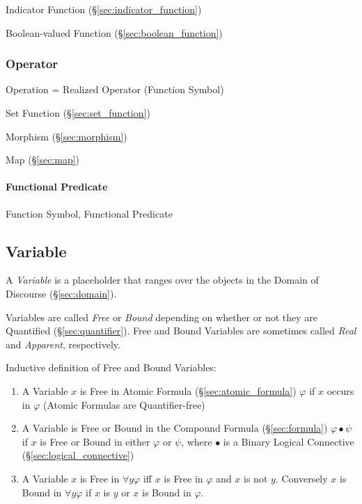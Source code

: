 Indicator Function (\S\ref{sec:indicator_function})

Boolean-valued Function (\S\ref{sec:boolean_function})



\subsubsection{Operator}\label{sec:operator}

Operation = Realized Operator (Function Symbol)

Set Function (\S\ref{sec:set_function})

Morphism (\S\ref{sec:morphism})

Map (\S\ref{sec:map})



\paragraph{Functional Predicate}\label{sec:functional_predicate}\hfill

Function Symbol, Functional Predicate



\subsection{Variable}\label{sec:variable}

A \emph{Variable} is a placeholder that ranges over the objects in the
Domain of Discourse (\S\ref{sec:domain}).

Variables are called \emph{Free} or \emph{Bound} depending on whether
or not they are Quantified (\S\ref{sec:quantifier}). Free and Bound
Variables are sometimes called \emph{Real} and \emph{Apparent},
respectively.

Inductive definition of Free and Bound Variables:
\begin{enumerate}
\item A Variable $x$ is Free in Atomic Formula
  (\S\ref{sec:atomic_formula}) $\varphi$ if $x$ occurs in $\varphi$
  (Atomic Formulas are Quantifier-free)
\item A Variable is Free or Bound in the Compound Formula
  (\S\ref{sec:formula}) $\varphi \bullet \psi$ if $x$ is Free or Bound
  in either $\varphi$ or $\psi$, where $\bullet$ is a Binary Logical
  Connective (\S\ref{sec:logical_connective})
\item A Variable $x$ is Free in $\forall y \varphi$ iff $x$ is Free in
  $\varphi$ and $x$ is not $y$. Conversely $x$ is Bound in $\forall y
  \varphi$ if $x$ is $y$ or $x$ is Bound in $\varphi$.
\end{enumerate}

